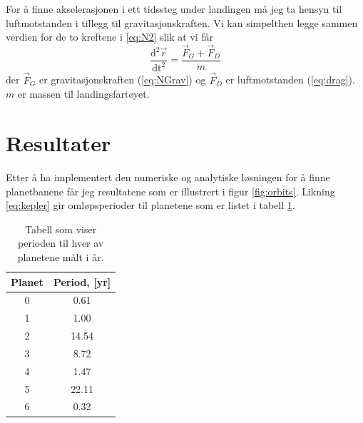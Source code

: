 \documentclass[reprint,english,notitlepage]{revtex4-1}  %
\begin{document}
For å finne akselerasjonen i ett tidssteg under landingen må jeg ta hensyn til luftmotstanden i
 tillegg til gravitasjonskraften. Vi kan simpelthen legge sammen verdien for de to kreftene i \ref{eq:N2} slik at vi får
 \begin{equation}
   \label{eq:acceleration_G_D}
   \frac{\mathrm{d}^2 \vec{r}}{\mathrm{dt}^2} = \frac{\vec{F}_G + \vec{F}_D}{m}
 \end{equation}
 der $\vec{F}_G$ er gravitasjonskraften (\ref{eq:NGrav}) og $\vec{F}_D$ er luftmotstanden (\ref{eq:drag}). $m$ er massen til landingsfartøyet.




\section{Resultater}

Etter å ha implementert den numeriske og analytiske løsningen for å finne planetbanene får jeg resultatene som er illustrert i figur \ref{fig:orbits}. Likning \ref{eq:kepler} gir omløpsperioder til planetene som er listet i tabell \ref{table:periods}.
\begin{table}
\begin{adjustbox}{width=4cm}
\begin{tabular}{||c | c||}
\hline
Planet & Period, [yr]    \\ \hline
0 & 0.61    \\ \hline
1 & 1.00    \\ \hline
2 & 14.54    \\ \hline
3 & 8.72    \\ \hline
4 & 1.47    \\ \hline
5 & 22.11    \\ \hline
6 & 0.32    \\ \hline
\end{tabular}
\end{adjustbox}
\caption{Tabell som viser perioden til hver av planetene målt i år.}
\label{table:periods}
\end{table}
\end{document}
